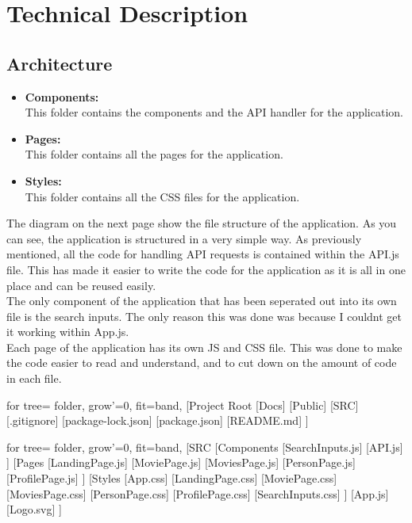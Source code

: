 \documentclass[12pt,a4paper]{article}
\begin{document}
	\section{Technical Description}
		\subsection{Architecture}
			\begin{itemize}
				\item \textbf{Components:}\\
					This folder contains the components and the API handler for the application.
				\item \textbf{Pages:}\\
					This folder contains all the pages for the application.
				\item \textbf{Styles:}\\
					This folder contains all the CSS files for the application.
		  	\end{itemize}
			The diagram on the next page show the file structure of the application. As you can see, the 
			application is structured in a very simple way. As previously mentioned, all the code for 
			handling API requests is contained within the API.js file. This has made it easier to write 
			the code for the application as it is all in one place and can be reused easily.\\
			
			The only component of the application that has been seperated out into its own file is the 
			search inputs. The only reason this was done was because I couldnt get it working within 
			App.js.\\

			Each page of the application has its own JS and CSS file. This was done to make the code 
			easier to read and understand, and to cut down on the amount of code in each file.\\	
		
			\begin{minipage}[b]{0.5\textwidth}
				\begin{forest}
					for tree={
					  folder,
					  grow'=0,
					  fit=band,
					}
					[Project Root
						[Docs]
						[Public]
						[SRC]
						[.gitignore]
						[package-lock.json]
						[package.json]
						[README.md]
					]
				\end{forest}
			\end{minipage}
			\hfill
			\begin{minipage}[c]{0.5\textwidth} 
				\begin{forest}
				for tree={
				  folder,
				  grow'=0,
				  fit=band,
				}
				[SRC
				  [Components
					[SearchInputs.js]
					[API.js]
				  ]
				  [Pages
					[LandingPage.js]
					[MoviePage.js]
					[MoviesPage.js]
					[PersonPage.js]
					[ProfilePage.js]
				  ]
				  [Styles
					[App.css]
					[LandingPage.css]
					[MoviePage.css]
					[MoviesPage.css]
					[PersonPage.css]
					[ProfilePage.css]
					[SearchInputs.css]
				  ]
				  [App.js]
				  [Logo.svg]
				]
			  \end{forest}
			\end{minipage}
			\newpage
\end{document}
